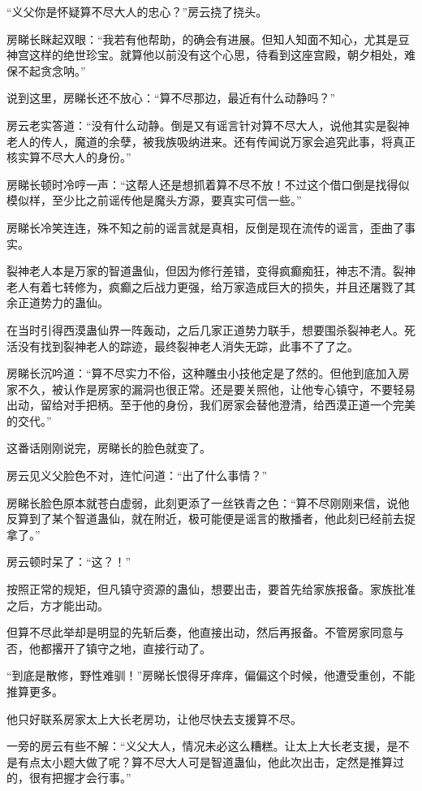 \begin{this_body}
“义父你是怀疑算不尽大人的忠心？”房云挠了挠头。

房睇长眯起双眼：“我若有他帮助，的确会有进展。但知人知面不知心，尤其是豆神宫这样的绝世珍宝。就算他以前没有这个心思，待看到这座宫殿，朝夕相处，难保不起贪念呐。”

说到这里，房睇长还不放心：“算不尽那边，最近有什么动静吗？”

房云老实答道：“没有什么动静。倒是又有谣言针对算不尽大人，说他其实是裂神老人的传人，魔道的余孽，被我族吸纳进来。还有传闻说万家会追究此事，将真正核实算不尽大人的身份。”

房睇长顿时冷哼一声：“这帮人还是想抓着算不尽不放！不过这个借口倒是找得似模似样，至少比之前谣传他是魔头方源，要真实可信一些。”

房睇长冷笑连连，殊不知之前的谣言就是真相，反倒是现在流传的谣言，歪曲了事实。

裂神老人本是万家的智道蛊仙，但因为修行差错，变得疯癫痴狂，神志不清。裂神老人有着七转修为，疯癫之后战力更强，给万家造成巨大的损失，并且还屠戮了其余正道势力的蛊仙。

在当时引得西漠蛊仙界一阵轰动，之后几家正道势力联手，想要围杀裂神老人。死活没有找到裂神老人的踪迹，最终裂神老人消失无踪，此事不了了之。

房睇长沉吟道：“算不尽实力不俗，这种雕虫小技他定是了然的。但他到底加入房家不久，被认作是房家的漏洞也很正常。还是要关照他，让他专心镇守，不要轻易出动，留给对手把柄。至于他的身份，我们房家会替他澄清，给西漠正道一个完美的交代。”

这番话刚刚说完，房睇长的脸色就变了。

房云见义父脸色不对，连忙问道：“出了什么事情？”

房睇长脸色原本就苍白虚弱，此刻更添了一丝铁青之色：“算不尽刚刚来信，说他反算到了某个智道蛊仙，就在附近，极可能便是谣言的散播者，他此刻已经前去捉拿了。”

房云顿时呆了：“这？！”

按照正常的规矩，但凡镇守资源的蛊仙，想要出击，要首先给家族报备。家族批准之后，方才能出动。

但算不尽此举却是明显的先斩后奏，他直接出动，然后再报备。不管房家同意与否，他都撂开了镇守之地，直接行动了。

“到底是散修，野性难驯！”房睇长恨得牙痒痒，偏偏这个时候，他遭受重创，不能推算更多。

他只好联系房家太上大长老房功，让他尽快去支援算不尽。

一旁的房云有些不解：“义父大人，情况未必这么糟糕。让太上大长老支援，是不是有点太小题大做了呢？算不尽大人可是智道蛊仙，他此次出击，定然是推算过的，很有把握才会行事。”


\end{this_body}
